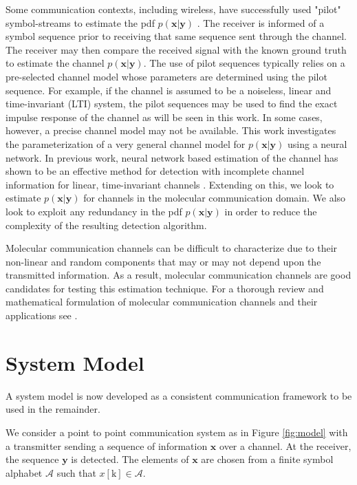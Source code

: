 \documentclass[12pt,a4paper]{report}
\begin{document}
\par
Some communication contexts, including wireless, have successfully used "pilot" symbol-streams to estimate the pdf $p(\mathbf{x}|\mathbf{y})$ \cite{van1995channel}. The receiver is informed of a symbol sequence prior to receiving that same sequence sent through the channel. The receiver may then compare the received signal with the known ground truth to estimate the channel $p(\mathbf{x}|\mathbf{y})$.
The use of pilot sequences typically relies on a pre-selected channel model whose parameters are determined using the pilot sequence. For example, if the channel is assumed to be a noiseless, linear and time-invariant (LTI) system, the pilot sequences may be used to find the exact impulse response of the channel as will be seen in this work. In some cases, however, a precise channel model may not be available. This work investigates the parameterization of a very general channel model for $p(\mathbf{x}|\mathbf{y})$ using a neural network. In previous work, neural network based estimation of the channel has shown to be an effective method for detection with incomplete channel information for linear, time-invariant channels \cite{shlezinger2019viterbinet} \cite{shlezinger2020datadriven}.
 Extending on this, we look to estimate $p(\mathbf{x}|\mathbf{y})$ for channels in the molecular communication domain.
 We also look to exploit any redundancy in the pdf $p(\mathbf{x}|\mathbf{y})$ in order to reduce the complexity of the resulting detection algorithm.
\par
Molecular communication channels can be difficult to characterize due to their non-linear and random components that may or may not depend upon the transmitted information. As a result, molecular communication channels are good candidates for testing this estimation technique. For a thorough review and mathematical formulation of molecular communication channels and their applications see \cite{jamali2019channel}. 

\par

\section{System Model}

A system model is now developed as a consistent communication framework to be used in the remainder.
\par
We consider a point to point communication system as in Figure \ref{fig:model} with a transmitter sending a sequence of information $\mathbf{x}$ over a channel. At the receiver, the sequence  $\mathbf{y}$ is detected. 
The elements of $\mathbf{x}$ are chosen from a finite symbol alphabet $\mathcal{A}$ such that $x[\text{k}] \in \mathcal{A}$.
\end{document}
